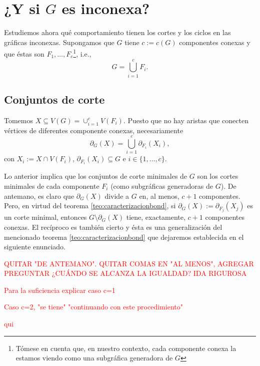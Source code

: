  
 \section{¿Y si $G$ es inconexa?}
 Estudiemos ahora qué comportamiento tienen los cortes y los ciclos en las gráficas inconexas. Supongamos que $G$ tiene $c:=c(G)$ componentes conexas y que éstas son $F_{1}, \ldots, F_{c}$\footnote{Tómese en cuenta que, en nuestro contexto, cada componente conexa la estamos viendo como una subgráfica generadora de $G$}, i.e., 
$$
G = \bigcup_{i=1}^{c}F_{i}.
$$
  \subsection{Conjuntos de corte}
   Tomemos $X \subseteq V(G) = \cup_{i = 1}^{c}V(F_{i})$. Puesto que no hay aristas que conecten vértices de diferentes componente conexas, necesariamente $$\partial_{G}(X) = \bigcup_{i=1}^{c} \partial_{F_{i}}(X_{i}),$$ con $X_{i}:=X \cap V(F_{i})$, $\partial_{F_{i}}(X_{i})\subseteq G$ e $i \in \{1, \ldots, c\}$.
   
   Lo anterior implica que los conjuntos de corte minimales de $G$ son los cortes minimales de cada componente $F_{i}$ (como subgráficas generadoras de $G$). De antemano, es claro que $\partial_{G}(X)$ divide a $G$ en, al menos, $c+1$ componentes. Pero, en virtud del teorema \ref{teo:caracterizacionbond}, si $\partial_{G}(X):=\partial_{F_{j}}(X_{j})$ es un corte minimal, entonces $G\setminus \partial_{G}(X)$ tiene, exactamente, $c+1$ componentes conexas. El recíproco es también cierto y ésta es una generalización del mencionado teorema \ref{teo:caracterizacionbond} que dejaremos establecida en el siguiente enunciado.
   
   \textcolor{red}{QUITAR "DE ANTEMANO". QUITAR COMAS EN "AL MENOS", AGREGAR PREGUNTAR ¿CUÁNDO SE ALCANZA LA IGUALDAD? IDA RIGUROSA
   
   Para la suficiencia explicar caso c=1
   
   Caso c=2, "se tiene" "continuando con este procedimiento"
   
   qui}
   
